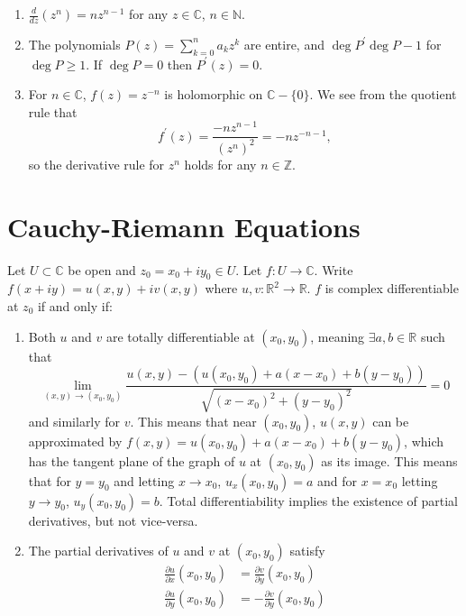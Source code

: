 \begin{xmpl}
  \begin{enumerate}
    \item{
      $\frac{d}{dz} (z^n) = n z^{n-1}$ for any $z \in \mathbb{C}$, $n \in \mathbb{N}$.
    }
    \item{
      The polynomials $P(z) = \sum_{k=0}^n a_k z^k$ are entire, and
      $\deg P^\prime \deg P - 1$ for $\deg P \geq 1$. If $\deg P = 0$ then
      $P^\prime(z) = 0$.
    }
    \item{
      For $n \in \mathbb{C}$, $f(z) = z^{-n}$ is holomorphic on $\mathbb{C} - \{ 0 \}$.
      We see from the quotient rule that
      $$
      f^\prime(z) = \frac{-n z^{n-1}}{(z^n)^2} = -n z^{-n - 1},
      $$
      so the derivative rule for $z^n$ holds for any $n \in \mathbb{Z}$.
    }
  \end{enumerate}
\end{xmpl}

\section{Cauchy-Riemann Equations}

\begin{theorem}
  Let $U \subset \mathbb{C}$ be open and $z_0 = x_0 + i y_0 \in U$.
  Let $f : U \to \mathbb{C}$. Write $f(x + i y) = u (x, y) + i v(x, y)$
  where $u, v : \mathbb{R}^2 \to \mathbb{R}$.
  $f$ is complex differentiable at $z_0$ if and only if:
  \begin{enumerate}
    \item{
      Both $u$ and $v$ are totally differentiable at $(x_0, y_0)$,
      meaning $\exists a, b \in \mathbb{R}$ such that
      $$
      \lim_{(x, y) \to (x_0, y_0)}
        \frac{u(x,y) - (u(x_0, y_0) + a(x - x_0) + b(y - y_0))}
             {\sqrt{(x - x_0)^2 + (y - y_0)^2}}
      = 0
      $$
      and similarly for $v$.
      This means that near $(x_0, y_0)$, $u(x,y)$ can be approximated
      by $f(x, y) = u(x_0, y_0) + a(x - x_0) + b(y - y_0)$, which has
      the tangent plane of the graph of $u$ at $(x_0, y_0)$ as its
      image. This means that for $y = y_0$ and letting $x \to x_0$,
      $u_x(x_0, y_0) = a$ and for $x = x_0$ letting $y \to y_0$,
      $u_y(x_0, y_0) = b$. Total differentiability implies the
      existence of partial derivatives, but not vice-versa.
    }
    \item{
      The partial derivatives of $u$ and $v$ at $(x_0, y_0)$ satisfy
      \begin{align*}
            \frac{\partial u}{\partial x} (x_0, y_0)
        &=  \frac{\partial v}{\partial y} (x_0, y_0) \\
            \frac{\partial u}{\partial y} (x_0, y_0)
        &= -\frac{\partial v}{\partial y} (x_0, y_0)
      \end{align*}
    }
  \end{enumerate}
\end{theorem}
